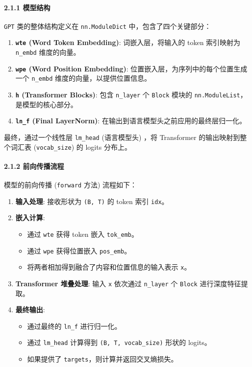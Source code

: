 \documentclass[a4paper]{article}
\providecommand{\tightlist}{%
  \setlength{\itemsep}{0pt}\setlength{\parskip}{0pt}}
\begin{document}
\paragraph{2.1.1 模型结构}\label{ux6a21ux578bux7ed3ux6784}

\texttt{GPT} 类的整体结构定义在 \texttt{nn.ModuleDict}
中，包含了四个关键部分：

\begin{enumerate}
\def\labelenumi{\arabic{enumi}.}
\tightlist
\item
  \textbf{\texttt{wte} (Word Token Embedding)}: 词嵌入层，将输入的 token
  索引映射为 \texttt{n\_embd} 维度的向量。
\item
  \textbf{\texttt{wpe} (Word Position Embedding)}:
  位置嵌入层，为序列中的每个位置生成一个 \texttt{n\_embd}
  维度的向量，以提供位置信息。
\item
  \textbf{\texttt{h} (Transformer Blocks)}: 包含 \texttt{n\_layer} 个
  \texttt{Block} 模块的 \texttt{nn.ModuleList}，是模型的核心部分。
\item
  \textbf{\texttt{ln\_f} (Final LayerNorm)}:
  在输出到语言模型头之前应用的最终层归一化。
\end{enumerate}

最终，通过一个线性层 \texttt{lm\_head} (语言模型头) ，将 Transformer
的输出映射到整个词汇表 (\texttt{vocab\_size}) 的 logits 分布上。

\paragraph{2.1.2
前向传播流程}\label{ux524dux5411ux4f20ux64adux6d41ux7a0b}

模型的前向传播 (\texttt{forward} 方法) 流程如下：

\begin{enumerate}
\def\labelenumi{\arabic{enumi}.}
\tightlist
\item
  \textbf{输入处理}: 接收形状为 \texttt{(B,\ T)} 的 token 索引
  \texttt{idx}。
\item
  \textbf{嵌入计算}:

  \begin{itemize}
  \tightlist
  \item
    通过 \texttt{wte} 获得 token 嵌入 \texttt{tok\_emb}。
  \item
    通过 \texttt{wpe} 获得位置嵌入 \texttt{pos\_emb}。
  \item
    将两者相加得到融合了内容和位置信息的输入表示 \texttt{x}。
  \end{itemize}
\item
  \textbf{Transformer 堆叠处理}: 输入 \texttt{x} 依次通过
  \texttt{n\_layer} 个 \texttt{Block} 进行深度特征提取。
\item
  \textbf{最终输出}:

  \begin{itemize}
  \tightlist
  \item
    通过最终的 \texttt{ln\_f} 进行归一化。
  \item
    通过 \texttt{lm\_head} 计算得到 \texttt{(B,\ T,\ vocab\_size)}
    形状的 logits。
  \item
    如果提供了 \texttt{targets}，则计算并返回交叉熵损失。
  \end{itemize}
\end{enumerate}
\end{document}
